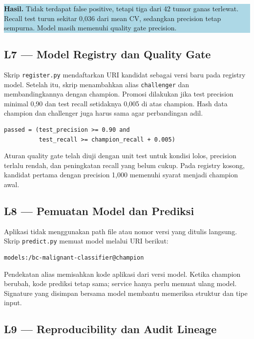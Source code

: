 \documentclass[11pt,a4paper]{article}
\newcommand{\resultbox}[1]{%
  \begin{center}
    \colorbox{lightblue}{\parbox{0.91\linewidth}{\textbf{Hasil.} #1}}
  \end{center}
}
\begin{document}
\resultbox{Tidak terdapat false positive, tetapi tiga dari 42 tumor ganas terlewat. Recall test turun sekitar 0,036 dari mean CV, sedangkan precision tetap sempurna. Model masih memenuhi quality gate precision.}

\subsection{L7 --- Model Registry dan Quality Gate}

Skrip \texttt{register.py} mendaftarkan URI kandidat sebagai versi baru pada registry model. Setelah itu, skrip menambahkan alias \texttt{challenger} dan membandingkannya dengan champion. Promosi dilakukan jika test precision minimal 0,90 dan test recall setidaknya 0,005 di atas champion. Hash data champion dan challenger juga harus sama agar perbandingan adil.

\begin{lstlisting}[style=terminal]
passed = (test_precision >= 0.90 and
          test_recall >= champion_recall + 0.005)
\end{lstlisting}

Aturan quality gate telah diuji dengan unit test untuk kondisi lolos, precision terlalu rendah, dan peningkatan recall yang belum cukup. Pada registry kosong, kandidat pertama dengan precision 1,000 memenuhi syarat menjadi champion awal.

\subsection{L8 --- Pemuatan Model dan Prediksi}

Aplikasi tidak menggunakan path file atau nomor versi yang ditulis langsung. Skrip \texttt{predict.py} memuat model melalui URI berikut:

\begin{lstlisting}[style=terminal]
models:/bc-malignant-classifier@champion
\end{lstlisting}

Pendekatan alias memisahkan kode aplikasi dari versi model. Ketika champion berubah, kode prediksi tetap sama; service hanya perlu memuat ulang model. Signature yang disimpan bersama model membantu memeriksa struktur dan tipe input.

\subsection{L9 --- Reproducibility dan Audit Lineage}
\end{document}
